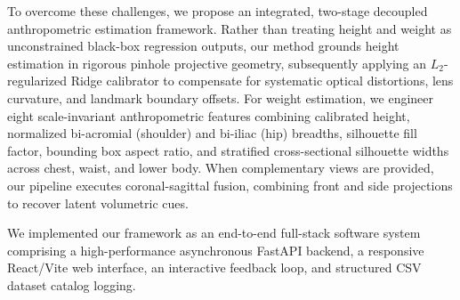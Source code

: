 \documentclass[conference]{IEEEtran}
\begin{document}
To overcome these challenges, we propose an integrated, two-stage decoupled anthropometric estimation framework. Rather than treating height and weight as unconstrained black-box regression outputs, our method grounds height estimation in rigorous pinhole projective geometry, subsequently applying an $L_2$-regularized Ridge calibrator to compensate for systematic optical distortions, lens curvature, and landmark boundary offsets. For weight estimation, we engineer eight scale-invariant anthropometric features combining calibrated height, normalized bi-acromial (shoulder) and bi-iliac (hip) breadths, silhouette fill factor, bounding box aspect ratio, and stratified cross-sectional silhouette widths across chest, waist, and lower body. When complementary views are provided, our pipeline executes coronal-sagittal fusion, combining front and side projections to recover latent volumetric cues.

We implemented our framework as an end-to-end full-stack software system comprising a high-performance asynchronous FastAPI backend, a responsive React/Vite web interface, an interactive feedback loop, and structured CSV dataset catalog logging. 
\end{document}
